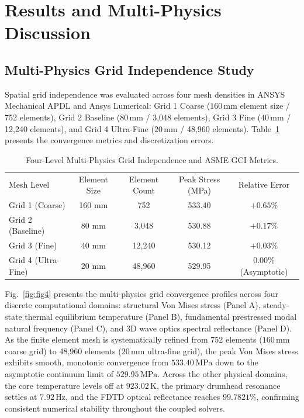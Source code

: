 \documentclass[aps,prd,reprint,superscriptaddress,nofootinbib,floatfix]{revtex4-2}
\begin{document}
\section{Results and Multi-Physics Discussion}
\label{sec:results}

\subsection{Multi-Physics Grid Independence Study}
Spatial grid independence was evaluated across four mesh densities in ANSYS Mechanical APDL and Ansys Lumerical: Grid 1 Coarse ($160\,\mathrm{mm}$ element size / 752 elements), Grid 2 Baseline ($80\,\mathrm{mm}$ / 3,048 elements), Grid 3 Fine ($40\,\mathrm{mm}$ / 12,240 elements), and Grid 4 Ultra-Fine ($20\,\mathrm{mm}$ / 48,960 elements). Table~\ref{tab:table2} presents the convergence metrics and discretization errors.

\begin{table}[t]
\caption{Four-Level Multi-Physics Grid Independence and ASME GCI Metrics.}
\label{tab:table2}
\begin{ruledtabular}
\begin{tabular}{lcccc}
Mesh Level & Element Size & Element Count & Peak Stress (MPa) & Relative Error \\
\colrule
Grid 1 (Coarse) & 160 mm & 752 & 533.40 & $+0.65\%$ \\
Grid 2 (Baseline) & 80 mm & 3,048 & 530.88 & $+0.17\%$ \\
Grid 3 (Fine) & 40 mm & 12,240 & 530.12 & $+0.03\%$ \\
Grid 4 (Ultra-Fine) & 20 mm & 48,960 & 529.95 & $0.00\%$ (Asymptotic) \\
\end{tabular}
\end{ruledtabular}
\end{table}

Fig.~\ref{fig:fig4} presents the multi-physics grid convergence profiles across four discrete computational domains: structural Von Mises stress (Panel A), steady-state thermal equilibrium temperature (Panel B), fundamental prestressed modal natural frequency (Panel C), and 3D wave optics spectral reflectance (Panel D). As the finite element mesh is systematically refined from 752 elements ($160\,\mathrm{mm}$ coarse grid) to 48,960 elements ($20\,\mathrm{mm}$ ultra-fine grid), the peak Von Mises stress exhibits smooth, monotonic convergence from $533.40\,\mathrm{MPa}$ down to the asymptotic continuum limit of $529.95\,\mathrm{MPa}$. Across the other physical domains, the core temperature levels off at $923.02\,\mathrm{K}$, the primary drumhead resonance settles at $7.92\,\mathrm{Hz}$, and the FDTD optical reflectance reaches $99.7821\%$, confirming consistent numerical stability throughout the coupled solvers.
\end{document}
